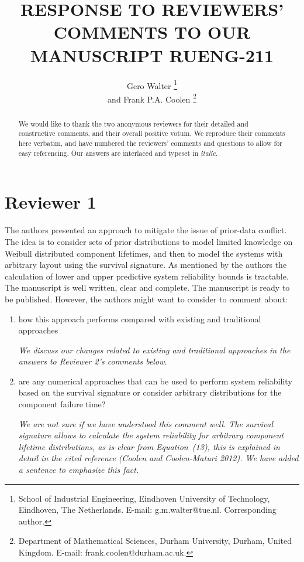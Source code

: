 \documentclass[Journal,SectionNumbers,SingleSpace,InsideFigs]{ascelike}
\begin{document}
\title{RESPONSE TO REVIEWERS' COMMENTS TO OUR MANUSCRIPT RUENG-211}

\author{
Gero Walter%
\thanks{
School of Industrial Engineering,
Eindhoven University of Technology, Eindhoven, The Netherlands.
E-mail: g.m.walter@tue.nl. Corresponding author.}
\\
and
Frank P.A. Coolen%
\thanks{
Department of Mathematical Sciences,
Durham University, Durham, United Kingdom.
E-mail: frank.coolen@durham.ac.uk.}
}

\maketitle

\begin{abstract}
We would like to thank the two anonymous reviewers for their detailed and constructive comments,
and their overall positive votum.
We reproduce their comments here verbatim,
and have numbered the reviewers' comments and questions to allow for easy referencing. 
Our answers are interlaced and typeset in \emph{italic}.
\end{abstract}


\section*{Reviewer 1}

The authors presented an approach to mitigate the issue of prior-data conflict.
The idea is to consider sets of prior distributions to model limited knowledge on Weibull distributed component lifetimes,
and then to model the systems with arbitrary layout using the survival signature.
As mentioned by the authors the calculation of lower and upper predictive system reliability bounds is tractable.
The manuscript is well written, clear and complete. The manuscript is ready to be published.
However, the authors might want to consider to comment about:
\begin{enumerate}
\item how this approach performs compared with existing and traditional approaches

\smallskip

\emph{We discuss our changes related to existing and traditional approaches in the answers to Reviewer 2's comments below.}

\item are any numerical approaches that can be used to perform system reliability based on the survival signature
or consider arbitrary distributions for the component failure time?

\smallskip

\emph{We are not sure if we have understood this comment well.
The survival signature allows to calculate the system reliability for arbitrary component lifetime distributions,
as is clear from Equation~(13), this is explained in detail in the cited reference (Coolen and Coolen-Maturi 2012).
We have added a sentence to emphasize this fact.}
\end{enumerate}
\end{document}
